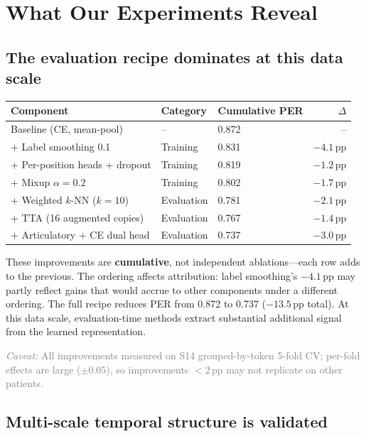 \documentclass[11pt,letterpaper]{article}
\newcommand{\caveat}[1]{\par\smallskip\noindent\textcolor{gray}{\textit{Caveat:} #1}\smallskip}
\newcommand{\pp}{\,\text{pp}}
\begin{document}
\section{What Our Experiments Reveal}\label{sec:experiments}

\subsection{The evaluation recipe dominates at this data scale}

\begin{table}[ht!]
\centering\small
\begin{tabular}{@{}lllr@{}}
\toprule
\textbf{Component} & \textbf{Category} & \textbf{Cumulative PER} & \textbf{$\Delta$} \\
\midrule
Baseline (CE, mean-pool) & -- & 0.872 & -- \\
+ Label smoothing 0.1 & Training & 0.831 & $-4.1\pp$ \\
+ Per-position heads + dropout & Training & 0.819 & $-1.2\pp$ \\
+ Mixup $\alpha{=}0.2$ & Training & 0.802 & $-1.7\pp$ \\
+ Weighted $k$-NN ($k{=}10$) & Evaluation & 0.781 & $-2.1\pp$ \\
+ TTA (16 augmented copies) & Evaluation & 0.767 & $-1.4\pp$ \\
+ Articulatory + CE dual head & Evaluation & 0.737 & $-3.0\pp$ \\
\bottomrule
\end{tabular}
\end{table}

\noindent These improvements are \textbf{cumulative}, not independent ablations---each row adds to the previous. The ordering affects attribution: label smoothing's $-4.1\pp$ may partly reflect gains that would accrue to other components under a different ordering. The full recipe reduces PER from 0.872 to 0.737 ($-13.5\pp$ total). At this data scale, evaluation-time methods extract substantial additional signal from the learned representation.

\caveat{All improvements measured on S14 grouped-by-token 5-fold CV; per-fold effects are large (${\pm}0.05$), so improvements ${<}2\pp$ may not replicate on other patients.}

\subsection{Multi-scale temporal structure is validated}
\end{document}
